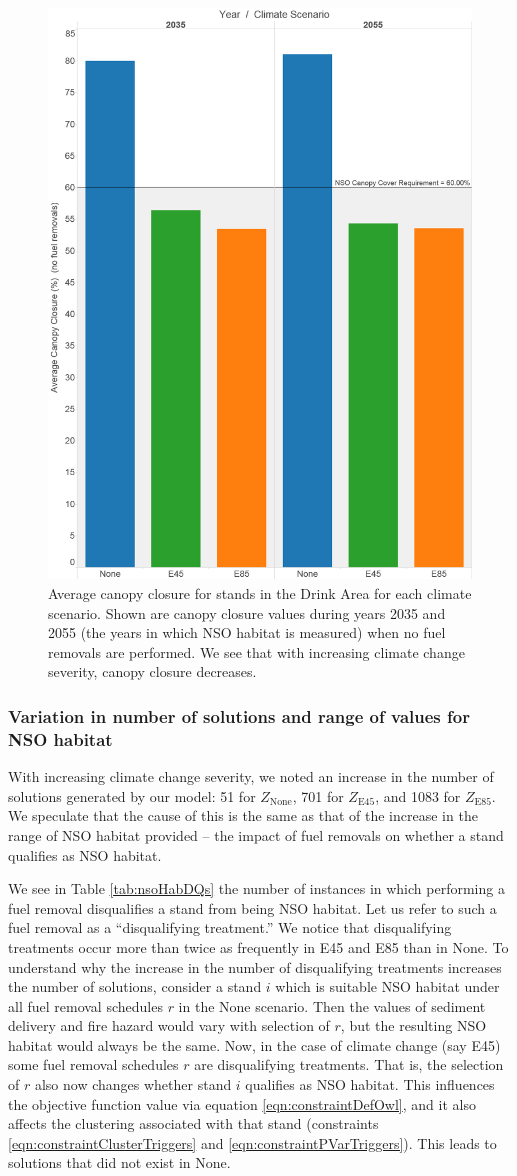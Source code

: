 \begin{figure}[ht]
\centering
\includegraphics[width=.5\textwidth]{../images/AvgCanopyCover_NoTrtmts}
\caption[Average canopy closure in the Drink Area across climate scenarios]{Average canopy closure for stands in the Drink Area for each climate scenario. Shown are canopy closure values during years 2035 and 2055 (the years in which NSO habitat is measured) when no fuel removals are performed. We see that with increasing climate change severity, canopy closure decreases.}
\label{fig:canopyClosure}
\end{figure}


\subsubsection{Variation in number of solutions and range of values for NSO habitat}
With increasing climate change severity, we noted an increase in the number of solutions generated by our model:  51 for $Z_{\text{None}}$, 701 for $Z_{\text{E45}}$, and 1083 for $Z_{\text{E85}}$. We speculate that the cause of this is the same as that of the increase in the range of NSO habitat provided -- the impact of fuel removals on whether a stand qualifies as NSO habitat.

We see in Table \ref{tab:nsoHabDQs} the number of instances in which performing a fuel removal disqualifies a stand from being NSO habitat. Let us refer to such a fuel removal as a ``disqualifying treatment.'' We notice that disqualifying treatments occur more than twice as frequently in E45 and E85 than in None. To understand why the increase in the number of disqualifying treatments increases the number of solutions, consider a stand $i$ which is suitable NSO habitat under all fuel removal schedules $r$ in the None scenario. Then the values of sediment delivery and fire hazard would vary with selection of $r$, but the resulting NSO habitat would always be the same. Now, in the case of climate change (say E45) some fuel removal schedules $r$ are disqualifying treatments. That is, the selection of $r$ also now changes whether stand $i$ qualifies as NSO habitat. This influences the objective function value via equation \eqref{eqn:constraintDefOwl}, and it also affects the clustering associated with that stand (constraints \eqref{eqn:constraintClusterTriggers} and \eqref{eqn:constraintPVarTriggers}). This leads to solutions that did not exist in None.

